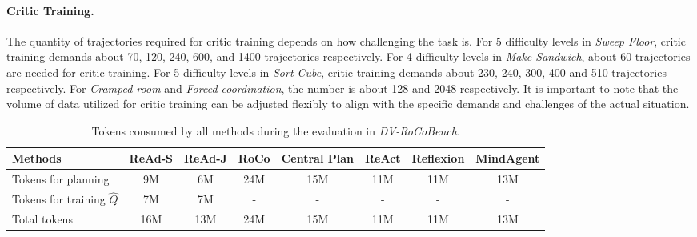 \documentclass[11pt]{article}
\theoremstyle{plain}
\theoremstyle{remark}
\begin{document}
\paragraph{Critic Training.} The quantity of trajectories required for critic training depends on how challenging the task is. For 5 difficulty levels in \emph{Sweep Floor}, critic training demands about 70, 120, 240, 600, and 1400 trajectories respectively. For 4 difficulty levels in \emph{Make Sandwich}, about 60 trajectories are needed for critic training.
For 5 difficulty levels in \emph{Sort Cube}, critic training demands about 230, 240, 300, 400 and 510 trajectories respectively.
For \emph{Cramped room} and \emph{Forced coordination}, the number is about 128 and 2048 respectively.
It is important to note that the volume of data utilized for critic training can be adjusted flexibly to align with the specific demands and challenges of the actual situation.

\begin{table}[ht]
\caption{Tokens consumed by all methods during the evaluation in \emph{DV-RoCoBench}.}
\vspace{-1em}
\begin{center}
\begin{small}
\begin{tabular}{lccccccc}
\toprule
Methods                        & ReAd-S & ReAd-J  & RoCo & Central Plan & ReAct & Reflexion & MindAgent \\ \midrule
Tokens for planning            & 9M     & 6M      & 24M  & 15M          & 11M   & 11M       & 13M       \\ 
Tokens for training $\hat{Q}$  & 7M     & 7M      & -  & -          & -   & -       & -       \\ 
Total tokens                   & 16M    & 13M      & 24M  & 15M          & 11M   & 11M       & 13M       \\ \bottomrule
\end{tabular}
\end{small}
\end{center}
\label{table:rocobench_consuming}
\vspace{-2em}
\end{table}
\end{document}
